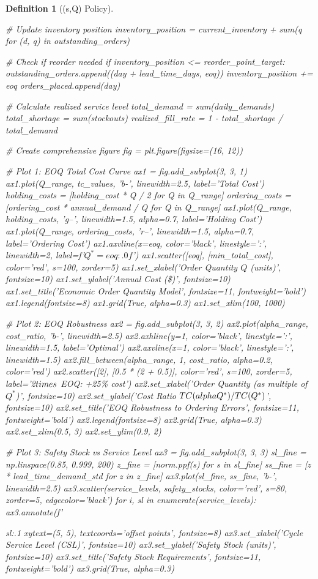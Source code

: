 \documentclass[a4paper, 11pt]{article}
\newtheorem{definition}{Definition}[section]
\begin{document}
\begin{definition}[(s,Q) Policy]
\begin{pycode}
    # Update inventory position
    inventory_position = current_inventory + sum(q for (d, q) in outstanding_orders)

    # Check if reorder needed
    if inventory_position <= reorder_point_target:
        outstanding_orders.append((day + lead_time_days, eoq))
        inventory_position += eoq
        orders_placed.append(day)

# Calculate realized service level
total_demand = sum(daily_demands)
total_shortage = sum(stockouts)
realized_fill_rate = 1 - total_shortage / total_demand

# Create comprehensive figure
fig = plt.figure(figsize=(16, 12))

# Plot 1: EOQ Total Cost Curve
ax1 = fig.add_subplot(3, 3, 1)
ax1.plot(Q_range, tc_values, 'b-', linewidth=2.5, label='Total Cost')
holding_costs = [holding_cost * Q / 2 for Q in Q_range]
ordering_costs = [ordering_cost * annual_demand / Q for Q in Q_range]
ax1.plot(Q_range, holding_costs, 'g--', linewidth=1.5, alpha=0.7, label='Holding Cost')
ax1.plot(Q_range, ordering_costs, 'r--', linewidth=1.5, alpha=0.7, label='Ordering Cost')
ax1.axvline(x=eoq, color='black', linestyle=':', linewidth=2, label=f'$Q^* = {eoq:.0f}$')
ax1.scatter([eoq], [min_total_cost], color='red', s=100, zorder=5)
ax1.set_xlabel('Order Quantity $Q$ (units)', fontsize=10)
ax1.set_ylabel('Annual Cost (\$)', fontsize=10)
ax1.set_title('Economic Order Quantity Model', fontsize=11, fontweight='bold')
ax1.legend(fontsize=8)
ax1.grid(True, alpha=0.3)
ax1.set_xlim(100, 1000)

# Plot 2: EOQ Robustness
ax2 = fig.add_subplot(3, 3, 2)
ax2.plot(alpha_range, cost_ratio, 'b-', linewidth=2.5)
ax2.axhline(y=1, color='black', linestyle=':', linewidth=1.5, label='Optimal')
ax2.axvline(x=1, color='black', linestyle=':', linewidth=1.5)
ax2.fill_between(alpha_range, 1, cost_ratio, alpha=0.2, color='red')
ax2.scatter([2], [0.5 * (2 + 0.5)], color='red', s=100, zorder=5,
            label='2$\\times$ EOQ: +25\% cost')
ax2.set_xlabel('Order Quantity (as multiple of $Q^*$)', fontsize=10)
ax2.set_ylabel('Cost Ratio $TC(\\alpha Q^*)/TC(Q^*)$', fontsize=10)
ax2.set_title('EOQ Robustness to Ordering Errors', fontsize=11, fontweight='bold')
ax2.legend(fontsize=8)
ax2.grid(True, alpha=0.3)
ax2.set_xlim(0.5, 3)
ax2.set_ylim(0.9, 2)

# Plot 3: Safety Stock vs Service Level
ax3 = fig.add_subplot(3, 3, 3)
sl_fine = np.linspace(0.85, 0.999, 200)
z_fine = [norm.ppf(s) for s in sl_fine]
ss_fine = [z * lead_time_demand_std for z in z_fine]
ax3.plot(sl_fine, ss_fine, 'b-', linewidth=2.5)
ax3.scatter(service_levels, safety_stocks, color='red', s=80, zorder=5, edgecolor='black')
for i, sl in enumerate(service_levels):
    ax3.annotate(f'{sl:.1%
                 xytext=(5, 5), textcoords='offset points', fontsize=8)
ax3.set_xlabel('Cycle Service Level (CSL)', fontsize=10)
ax3.set_ylabel('Safety Stock (units)', fontsize=10)
ax3.set_title('Safety Stock Requirements', fontsize=11, fontweight='bold')
ax3.grid(True, alpha=0.3)

}
\end{pycode}
\end{definition}
\end{document}
